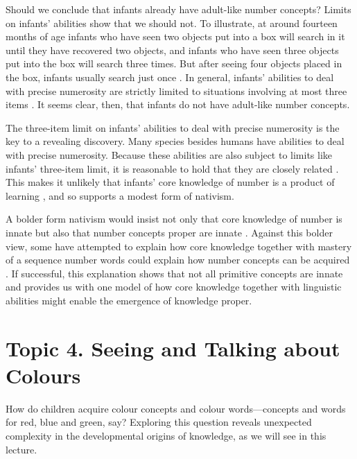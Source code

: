 \documentclass[12pt,\papersize]{extarticle}
\begin{document}
Should we conclude that infants already have adult-like number concepts?  
Limits on infants' abilities show that we should not. 
To illustrate, 
at around fourteen months of age infants who have seen two objects put into a box will search in it until they have recovered two objects, and infants who have seen three objects put into the box will search three times.
But after seeing four objects placed in the box, infants usually search just once \citep{feigenson_tracking_2003}. 
In general, infants' abilities to deal with precise numerosity are strictly limited to situations involving at most three items \citep{feigenson_tracking_2003}.
It seems clear, then, that infants do not have adult-like number concepts. 

The three-item limit on infants' abilities to deal with precise numerosity is the key to a revealing discovery.
Many species besides humans have abilities to deal with precise numerosity.
Because these abilities are also subject to limits like infants' three-item limit, it is reasonable to hold that they are  closely related \citep{hauser:2003_spontaneous}.  
This makes it unlikely that infants' core knowledge of number is  a product of learning \citep{feigenson:2004_core}, and so supports a modest form of nativism.

A bolder form nativism would insist not only that core knowledge of number is innate but also that number concepts proper are innate \citep{Fodor:1981ep}. 
Against this bolder view, some have attempted to explain how core knowledge together with mastery of a sequence number words could explain how number concepts can be acquired \citep{carey:2009_origin}. 
If successful, this explanation shows that not all primitive concepts are innate and provides us with one model of how core knowledge together with linguistic abilities might enable the emergence of knowledge proper.



\section{Topic 4. Seeing and Talking about Colours}
How do children acquire colour concepts and colour words---concepts and words for red, blue and green, say? 
Exploring this question reveals unexpected complexity in the developmental origins of knowledge, as we will see in this lecture.
\end{document}
